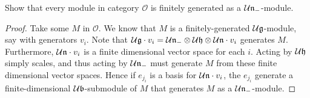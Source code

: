 \documentclass{../../mathnotes}
\begin{document}
\begin{prop}
    Show that every module in category $\mathcal{O}$ is finitely generated as a
    $\mathcal{U}\mathfrak n_{-}$-module.
\end{prop}
\begin{proof}
    Take some $M$ in $\mathcal{O}$. We know that $M$ is a finitely-generated $\mathcal{U}\mathfrak g$-module,
    say with generators $v_i$. Note that
    $\mathcal{U}\mathfrak g\cdot v_i=\mathcal{U}\mathfrak n_-\otimes\mathcal{U}\mathfrak h\otimes\mathcal{U}\mathfrak n\cdot v_i$
    generates $M$. Furthermore, $\mathcal{U}\mathfrak n\cdot v_i$ is a finite dimensional vector space for each $i$.
    Acting by $\mathcal{U}\mathfrak h$ simply scales, and thus acting by $\mathcal{U}\mathfrak n_-$ must generate $M$
    from these finite dimensional vector spaces.
    Hence if $e_{j_i}$ is a basis for $\mathcal{U}\mathfrak n\cdot v_i$, the $e_{j_i}$ generate a finite-dimensional
    $\mathcal{U}\mathfrak b$-submodule of $M$ that generates $M$ as a $\mathcal{U}\mathfrak n_-$-module.
\end{proof}
\end{document}
